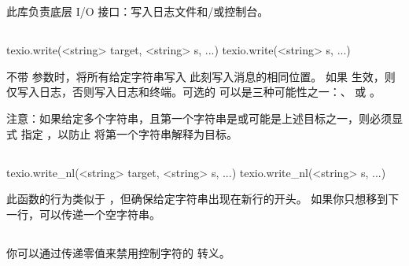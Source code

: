 \section{}


此库负责底层 I/O 接口：写入日志文件和/或控制台。

\subsection{}


\begin{typing}
texio.write(<string> target, <string> s, ...)
texio.write(<string> s, ...)
\end{typing}

不带  参数时，将所有给定字符串写入 \TEX 此刻写入消息的相同位置。
如果  生效，则仅写入日志，否则写入日志和终端。可选的
 可以是三种可能性之一：、 或
。

注意：如果给定多个字符串，且第一个字符串是或可能是上述目标之一，则必须显式
指定 ，以防止 \LUA 将第一个字符串解释为目标。

\subsection{}


\begin{typing}
texio.write_nl(<string> target, <string> s, ...)
texio.write_nl(<string> s, ...)
\end{typing}

此函数的行为类似于 ，但确保给定字符串出现在新行的开头。
如果你只想移到下一行，可以传递一个空字符串。

\subsection{}


你可以通过传递零值来禁用控制字符的 \type {\textasciicircum\textasciicircum{}} 转义。

\subsection{}

